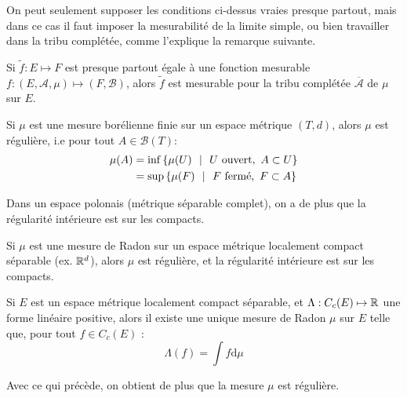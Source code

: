 \documentclass[11pt,a4paper]{article}
\begin{document}
\begin{rmq}
On peut seulement supposer les conditions ci-dessus vraies presque partout, mais dans ce cas il faut imposer la mesurabilité de la limite simple, ou bien travailler dans la tribu complétée, comme l'explique la remarque suivante.
\end{rmq}


\begin{rmq}
Si $\tilde{f} : E \mapsto F$ est presque partout égale à une fonction mesurable $f : (E,\mathcal{A},\mu) \mapsto (F,\mathcal{B})$, alors $\tilde{f}$ est mesurable pour la tribu complétée $\overline{\mathcal{A}}$ de $\mu$ sur $E$.
\end{rmq}

\begin{thmstar}
Si $\mu$ est une mesure borélienne finie sur un espace métrique $(T,d)$, alors $\mu$ est régulière, i.e pour tout $A \in \mathcal{B}(T)$:
\begin{align*}
\mu(A) &= \inf \left\{ \mu(U) \ \ \middle| \  \ U \text{ ouvert},\  A \subset U \right\} \\
&=\sup \left\{ \mu(F) \ \ \middle| \  \ F \text{ fermé}, \ F \subset A \right\}
\end{align*}
\end{thmstar}


\begin{rmq}
Dans un espace polonais (métrique séparable complet), on a de plus que la régularité intérieure est sur les compacts.
\end{rmq}

\begin{thmstar}
Si $\mu$ est une mesure de Radon sur un espace métrique localement compact séparable (ex. $\mathbb R^d$), alors $\mu$ est régulière, et  la régularité intérieure est sur les compacts. 
\end{thmstar}

\begin{thmstar}
Si $E$ est un espace métrique localement compact séparable, et $\Lambda : C_c(E) \mapsto \mathbb R$ une forme linéaire positive, alors il existe une unique mesure de Radon $\mu$ sur $E$ telle que, pour tout $f\in C_c(E)$ : 
\[\Lambda(f) = \int f \mathrm{d}\mu\]
\end{thmstar}

\begin{rmq}
Avec ce qui précède, on obtient de plus que la mesure $\mu$ est régulière.
\end{rmq}
\end{document}
